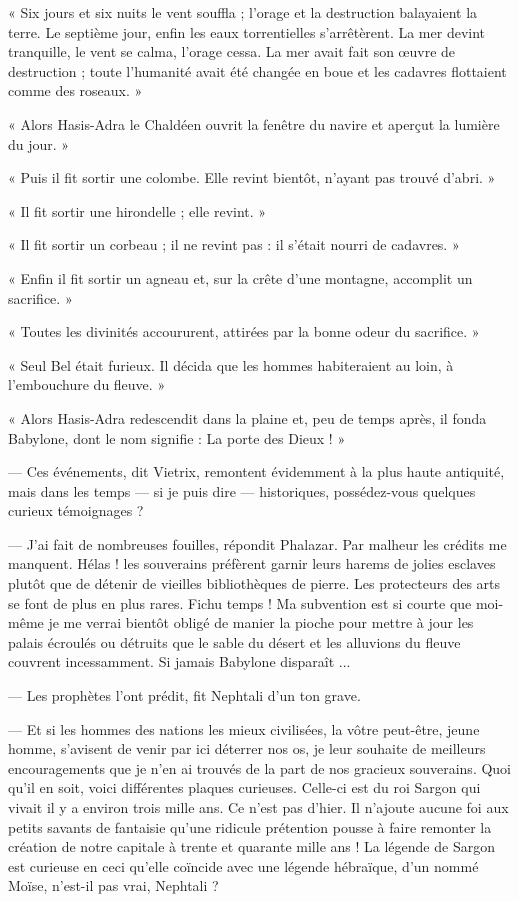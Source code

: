 \documentclass[a4paper, 11pt, oneside, polutonikogreek, french]{article}
\begin{document}
« Six jours et six nuits le vent souffla ; l'orage et la destruction balayaient la terre. Le septième jour, enfin les eaux torrentielles s'arrêtèrent. La mer devint tranquille, le vent se calma, l'orage cessa. La mer avait fait son œuvre de destruction ; toute l'humanité avait été changée en boue et les cadavres flottaient comme des roseaux. »

« Alors Hasis-Adra le Chaldéen ouvrit la fenêtre du navire et aperçut la lumière du jour. »

« Puis il fit sortir une colombe. Elle revint bientôt, n'ayant pas trouvé d'abri. »

« Il fit sortir une hirondelle ; elle revint. »

« Il fit sortir un corbeau ; il ne revint pas : il s'était nourri de cadavres. »

« Enfin il fit sortir un agneau et, sur la crête d'une montagne, accomplit un sacrifice. »

« Toutes les divinités accoururent, attirées par la bonne odeur du sacrifice. »

« Seul Bel était furieux. Il décida que les hommes habiteraient au loin, à l'embouchure du fleuve. »

« Alors Hasis-Adra redescendit dans la plaine et, peu de temps après, il fonda Babylone, dont le nom signifie : La porte des Dieux ! »

\bigskip
\centerline{\EightStarTaper}
\centerline{\EightStarTaper\EightStarTaper}
\bigskip

--- Ces événements, dit Vietrix, remontent évidemment à la plus haute antiquité, mais dans les temps --- si je puis dire --- historiques, possédez-vous quelques curieux témoignages ?

--- J'ai fait de nombreuses fouilles, répondit Phalazar. Par malheur les crédits me manquent. Hélas ! les souverains préfèrent garnir leurs harems de jolies esclaves plutôt que de détenir de vieilles bibliothèques de pierre. Les protecteurs des arts se font de plus en plus rares. Fichu temps ! Ma subvention est si courte que moi-même je me verrai bientôt obligé de manier la pioche pour mettre à jour les palais écroulés ou détruits que le sable du désert et les alluvions du fleuve couvrent incessamment. Si jamais Babylone disparaît ...

--- Les prophètes l'ont prédit, fit Nephtali d'un ton grave.

--- Et si les hommes des nations les mieux civilisées, la vôtre peut-être, jeune homme, s'avisent de venir par ici déterrer nos os, je leur souhaite de meilleurs encouragements que je n'en ai trouvés de la part de nos gracieux souverains. Quoi qu'il en soit, voici différentes plaques curieuses. Celle-ci est du roi Sargon qui vivait il y a environ trois mille ans. Ce n'est pas d'hier. Il n'ajoute aucune foi aux petits savants de fantaisie qu'une ridicule prétention pousse à faire remonter la création de notre capitale à trente et quarante mille ans ! La légende de Sargon est curieuse en ceci qu'elle coïncide avec une légende hébraïque, d'un nommé Moïse, n'est-il pas vrai, Nephtali ?
\end{document}
